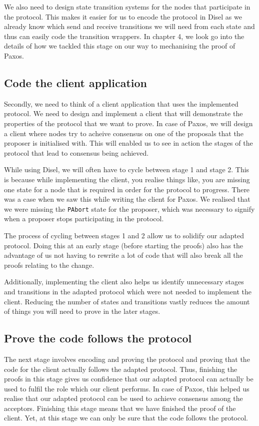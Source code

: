 We also need to design state transition systems for the nodes that participate
in the protocol. This makes it easier for us to encode the protocol in Disel as
we already know which send and receive transitions we will need from each state
and thus can easily code the transition wrappers.
In chapter 4, we look go into the details of how we tackled this stage on our way
to mechanising the proof of Paxos.

\subsection{Code the client application}
Secondly, we need to think of a client application that uses the implemented protocol.
We need to design and implement a client that will demonstrate the properties of the
protocol that we want to prove. In case of Paxos, we will design a client
where nodes try to acheive consensus on one of the proposals that the proposer
is initialised with. This will enabled us to see in action the stages of the protocol
that lead to consensus being achieved.

While using Disel, we will often have to cycle between stage 1 and stage 2.
This is because while implementing the client, you realise things like, you are
missing one state for a node that is required in order for the protocol to progress.
There was a case when we saw this while writing the client for Paxos.
We realised that we were missing the \texttt{PAbort}
state for the proposer, which was necessary to signify when a proposer stops
participating in the protocol.

The process of cycling between stages 1 and 2 allow us to solidify our adapted
protocol. Doing this at an early stage (before starting the proofs)
also has the advantage of us not having to rewrite a lot of code that will also
break all the proofs relating to the change.

Additionally, implementing the client also helps us identify unnecessary stages
and transitions in the adapted protocol which were not needed to implement the
client. Reducing the number of states and transitions vastly reduces the amount
of things you will need to prove in the later stages.

\subsection{Prove the code follows the protocol}
The next stage involves encoding and proving the protocol
and proving that the code for the client actually follows
the adapted protocol. Thus, finishing the proofs in this stage gives us
confidence that our adapted protocol can actually be used to fulfil the role
which our client performs. In case of Paxos, this helped us realise that our
adapted protocol can be used to achieve consensus among the acceptors.
Finishing this stage means that we have finished the proof of the client.
Yet, at this stage we can only be sure that the code follows the protocol.

